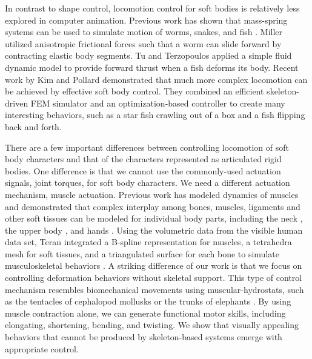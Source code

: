 In contrast to shape control, locomotion control for soft bodies is
relatively less explored in computer animation. Previous work has shown that mass-spring systems can be used to simulate motion of worms, snakes, and fish
\cite{Miller:1988,Tu:1994,Grzeszczuk:1995}. Miller
\cite{Miller:1988} utilized anisotropic frictional forces such
that a worm can slide forward by contracting elastic body segments. Tu
and Terzopoulos \cite{Tu:1994} applied a simple fluid dynamic
model to provide forward thrust when a fish deforms its body. Recent
work by Kim and Pollard \cite{Kim:2011:DCO,Kim:2011} demonstrated
that much more complex locomotion can be achieved by effective soft
body control. They combined an efficient skeleton-driven FEM simulator
and an optimization-based controller to create many interesting
behaviors, such as a star fish crawling out of a box and a fish
flipping back and forth.

There are a few important differences between controlling locomotion of soft body characters and that of the characters represented as articulated rigid bodies. One difference is that we cannot use the commonly-used actuation signals, joint torques, for soft body characters. We need a different actuation mechanism, muscle actuation. Previous work has modeled dynamics of muscles and
demonstrated that complex interplay among bones, muscles, ligaments and
other soft tissues can be modeled for individual body parts, including
the neck \cite{Lee:2006}, the upper body
\cite{Zordan:2006,Dilorenzo:2008,Lee:2009:CBM}, and hands
\cite{Tsang:2005,Sueda:2008}. Using the volumetric data from the
visible human data set, Teran \etal integrated a B-spline
representation for muscles, a tetrahedra mesh for soft tissues, and a
triangulated surface for each bone to simulate musculoskeletal
behaviors \cite{Teran:2003,Teran:2005}. A striking difference of our
work is that we focus on controlling deformation behaviors without
skeletal support. This type of control mechanism resembles
biomechanical movements using muscular-hydrostats, such as the
tentacles of cephalopod mollusks or the trunks of elephants
\cite{Kier:1985}. By using muscle contraction alone, we can generate
functional motor skills, including elongating, shortening,
bending, and twisting. We show that visually appealing behaviors that
cannot be produced by skeleton-based systems emerge with
appropriate control.

